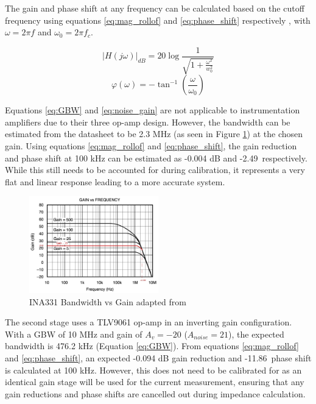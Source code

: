 The gain and phase shift at any frequency can be calculated based on the cutoff frequency using equations \ref{eq:mag_rollof} and \ref{eq:phase_shift} respectively \cite{oljacaOperationalAmplifierGain2010}, with $\omega=2\pi f$ and $\omega_0=2\pi f_c$.

\begin{equation}
    |H(j\omega)|_{dB} = 20\log\frac{1}{\sqrt{1+\frac{\omega^2}{w_0^2}}}
    \label{eq:mag_rollof}
\end{equation}
\begin{equation}
    \varphi(\omega) = -\tan^{-1}(\frac{\omega}{\omega_0})
    \label{eq:phase_shift}
\end{equation}

Equations \ref{eq:GBW} and \ref{eq:noise_gain} are not applicable to instrumentation amplifiers due to their three op-amp design. However, the bandwidth can be estimated from the datasheet to be 2.3 MHz (as seen in Figure \ref{fig:ina_bw}) at the chosen gain. Using equations \ref{eq:mag_rollof} and \ref{eq:phase_shift}, the gain reduction and phase shift at 100 kHz can be estimated as -0.004 dB and -2.49\textdegree\ respectively. While this still needs to be accounted for during calibration, it represents a very flat and linear response leading to a more accurate system.

\begin{figure}[H]
    \centering
    \includegraphics[width=0.5\textwidth]{INA_BW.jpeg}
    \caption[INA331 Bandwidth vs Gain]{INA331 Bandwidth vs Gain adapted from \cite{INA331}}
    \label{fig:ina_bw}
\end{figure}

The second stage uses a TLV9061 op-amp in an inverting gain configuration. With a GBW of 10 MHz and gain of $A_v=-20$ ($A_{noise}=21$), the expected bandwidth is 476.2 kHz (Equation \ref{eq:GBW}). From equations \ref{eq:mag_rollof} and \ref{eq:phase_shift}, an expected -0.094 dB gain reduction and -11.86\textdegree\ phase shift is calculated at 100 kHz. However, this does not need to be calibrated for as an identical gain stage will be used for the current measurement, ensuring that any gain reductions and phase shifts are cancelled out during impedance calculation.

